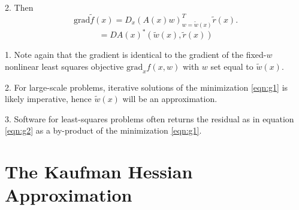 2.  Then
$$
\mbox{grad} \tilde{f}(x) = D_x(A(x)w)^T_{w=\tilde{w}(x)} \tilde{r}(x).
$$
\begin{equation}
  \label{eqn:g3}
= DA(x)^*(\tilde{w}(x),\tilde{r}(x))
\end{equation}

1. Note again that the gradient is identical to the gradient of the fixed-$w$ nonlinear least squares objective $\mbox{grad}_{x} f(x,w)$ with $w$ set equal to $\tilde{w}(x)$.

2. For large-scale problems, iterative solutions of the minimization \ref{eqn:g1} is likely imperative, hence $\tilde{w}(x)$ will be an approximation.

3. Software for least-squares problems often returns the residual as in equation \ref{eqn:g2} as a by-product of the minimization \ref{eqn:g1}.

\section{The Kaufman Hessian Approximation}


